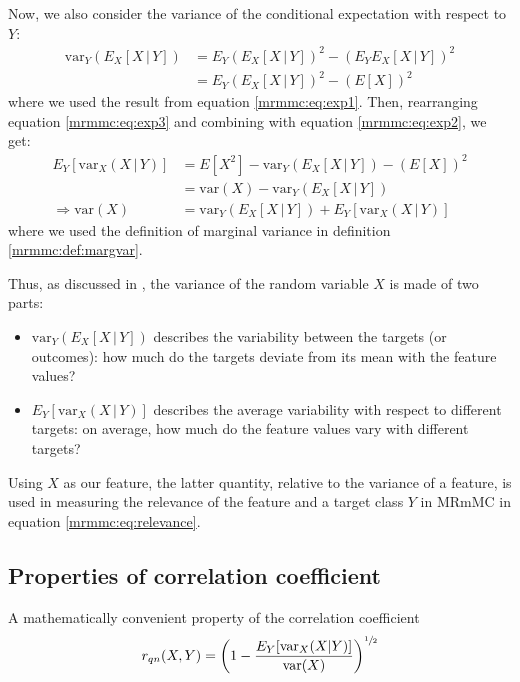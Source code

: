 \documentclass[12pt, twoside, a4paper]{report}
\def\var{\text{var}}
\begin{document}
Now, we also consider the variance of the conditional expectation with respect to $Y$:
\begin{align}
\var_Y (E_X[X \, | \, Y]) &= E_Y \left( E_X[X \, | \, Y]\right)^2 - \left( E_YE_X[X \, | \, Y] \right)^2 \\
&= E_Y \left( E_X[X \, | \, Y]\right)^2 - \left( E[X] \right)^2 \label{mrmmc:eq:exp3}
\end{align}
where we used the result from equation \ref{mrmmc:eq:exp1}. Then, rearranging equation \ref{mrmmc:eq:exp3} and combining with equation \ref{mrmmc:eq:exp2}, we get:
\begin{align*}
E_Y [ \var_X(X \, | \, Y) ] &= E[X^2] - \var_Y (E_X[X \, | \, Y]) - \left( E[X] \right)^2 \\
&= \var(X) - \var_Y (E_X[X \, | \, Y]) \\
\Rightarrow \var(X) &= \var_Y (E_X[X \, | \, Y]) + E_Y [ \var_X(X \, | \, Y) ]
\end{align*}
where we used the definition of marginal variance in definition \ref{mrmmc:def:margvar}.

Thus, as discussed in \cite{RefWorks:187}, the variance of the random variable $X$ is made of two parts: 
\begin{itemize}
  \item $\var_Y (E_X[X \, | \, Y])$ describes the variability between the targets (or outcomes): how much do the targets deviate from its mean with the feature values?
  
  \item $E_Y [ \var_X(X \, | \, Y) ]$ describes the average variability with respect to different targets: on average, how much do the feature values vary with different targets?
\end{itemize}

Using $X$ as our feature, the latter quantity, relative to the variance of a feature, is used in measuring the relevance of the feature and a target class $Y$ in MRmMC in equation \ref{mrmmc:eq:relevance}.

\subsection{Properties of correlation coefficient}
A mathematically convenient property of the correlation coefficient
\begin{align*}
r_{qn}(X, Y) = \left( 1 - \frac{E_Y[\var_X(X|Y)]}{\var(X)} \right)^{\sfrac{1}{2}}
\end{align*}
\end{document}
